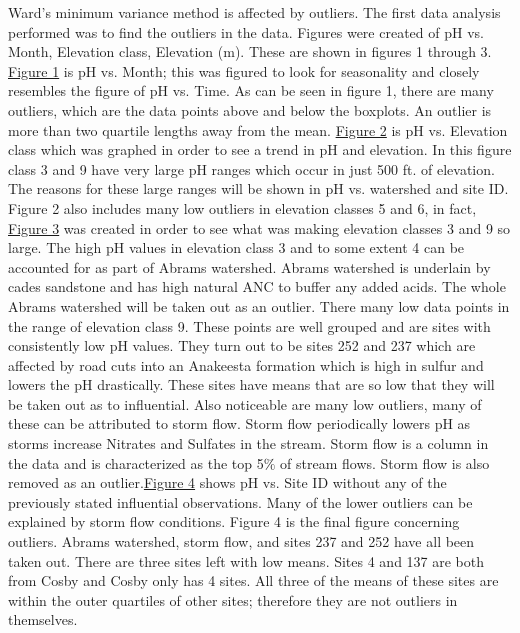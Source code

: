 \documentclass[11pt]{article} %
\begin{document}
Ward’s minimum variance method is affected by outliers.  The first data analysis performed was to find the outliers in the data.  Figures were created of pH vs. Month, Elevation class, Elevation (m).  These are shown in figures 1 through 3.  \hyperref[CAGraph1]{Figure 1} is pH vs. Month; this was figured to look for seasonality and closely resembles the figure of pH vs. Time.  As can be seen in figure 1, there are many outliers, which are the data points above and below the boxplots.  An outlier is more than two quartile lengths away from the mean.  \hyperref[CAGraph2]{Figure 2} is pH vs. Elevation class which was graphed in order to see a trend in pH and elevation.  In this figure class 3 and 9 have very large pH ranges which occur in just 500 ft. of elevation.  The reasons for these large ranges will be shown in pH vs. watershed and site ID.  Figure 2 also includes many low outliers in elevation classes 5 and 6, in fact, \hyperref[CAGraph3]{Figure 3} was created in order to see what was making elevation classes 3 and 9 so large.  The high pH values in elevation class 3 and to some extent 4 can be accounted for as part of Abrams watershed.  Abrams watershed is underlain by cades sandstone and has high natural ANC to buffer any added acids.  The whole Abrams watershed will be taken out as an outlier.  There many low data points in the range of elevation class 9.  These points are well grouped and are sites with consistently low pH values.  They turn out to be sites 252 and 237 which are affected by road cuts into an Anakeesta formation which is high in sulfur and  lowers the pH drastically.  These sites have means that are so low that they will be taken out as to influential.    Also noticeable are many low outliers, many of these can be attributed to storm flow.  Storm flow periodically lowers pH as storms increase Nitrates and Sulfates in the stream.  Storm flow is a column in the data and is characterized as the top 5$\%$ of stream flows.  Storm flow is also removed as an outlier.\hyperref[CAGraph6]{Figure 4} shows pH vs. Site ID without any of the previously stated influential observations.  Many of the lower outliers can be explained by storm flow conditions.  Figure 4 is the final figure concerning outliers.  Abrams watershed, storm flow, and sites 237 and 252 have all been taken out.  There are three sites left with low means.  Sites 4 and 137 are both from Cosby and Cosby only has 4 sites.  All three of the means of these sites are within the outer quartiles of other sites; therefore they are not outliers in themselves.
    
\end{document}
